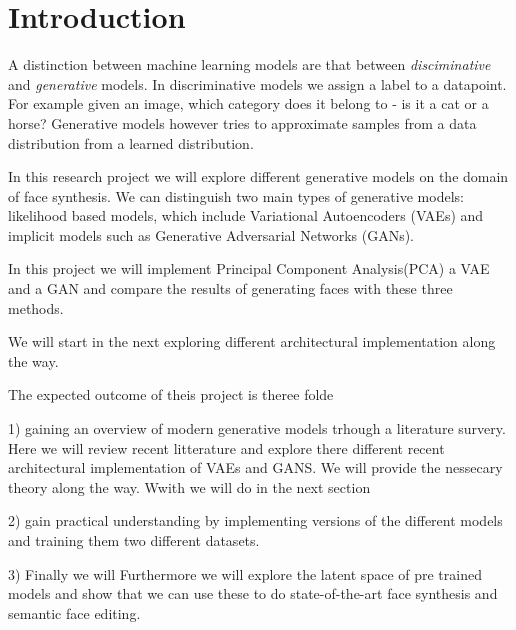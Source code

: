 \section{Introduction}

A distinction between machine learning models are that between \emph{disciminative} and \emph{generative} models. In discriminative models we assign a label to a datapoint. For example given an image, which category does it belong to - is it a cat or a horse? Generative models however tries to approximate samples from a data distribution from a learned distribution.

In this research project we will explore different generative models on the domain of face synthesis. We can distinguish two main types of generative models: likelihood based models, which include Variational Autoencoders (VAEs) and implicit models such as Generative Adversarial Networks (GANs)\cite{vqvae2}.

In this project we will implement Principal Component Analysis(PCA) a VAE and a GAN and compare the results of generating faces with these three methods.

We will start in the next
exploring different architectural implementation along the way.

The expected outcome of theis project is theree folde

1) gaining an overview of modern generative models trhough a literature survery. Here we will review recent litterature and explore there different recent  architectural implementation of VAEs and GANS. We will provide the nessecary theory along the way. Wwith we will do in the next section

2) gain practical understanding by implementing versions of the different models and training them two different datasets.

3) Finally we will Furthermore we will explore the latent space of pre trained models and show that we can use these to do state-of-the-art face synthesis and semantic face editing.
